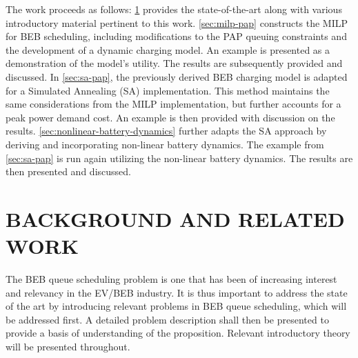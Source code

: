 \documentclass[ee,thesis]{usuthesis}
\begin{document}
The work proceeds as follows: \ref{sec:background-and-related-work} provides the state-of-the-art along with various
introductory material pertinent to this work. \ref{sec:milp-pap} constructs the MILP for BEB scheduling, including
modifications to the PAP queuing constraints and the development of a dynamic charging model. An example is presented as
a demonstration of the model's utility. The results are subsequently provided and discussed. In \ref{sec:sa-pap}, the
previously derived BEB charging model is adapted for a Simulated Annealing (SA) implementation. This method maintains
the same considerations from the MILP implementation, but further accounts for a peak power demand cost. An example is
then provided with discussion on the results. \ref{sec:nonlinear-battery-dynamics} further adapts the SA approach by deriving
and incorporating non-linear battery dynamics. The example from \ref{sec:sa-pap} is run again utilizing the non-linear
battery dynamics. The results are then presented and discussed.
\chapter{BACKGROUND AND RELATED WORK}
\label{sec:background-and-related-work}
The BEB queue scheduling problem is one that has been of increasing interest and relevancy in the EV/BEB industry. It is
thus important to address the state of the art by introducing relevant problems in BEB queue scheduling, which will be
addressed first. A detailed problem description shall then be presented to provide a basis of understanding of the
proposition. Relevant introductory theory will be presented throughout.
\end{document}
